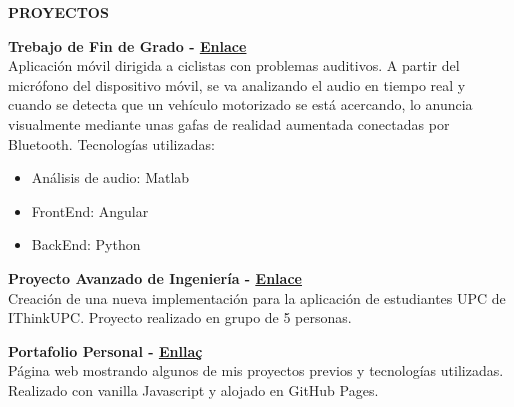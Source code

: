 \documentclass[../main.tex]{subfiles}
\begin{document}
    \textbf{\textcolor{myCV2}{PROYECTOS\underline{\hspace{15.43cm}}}}
    \vspace*{0.3cm}
    
    \textbf{Trebajo de Fin de Grado - 
        \hspace*{0.07cm}
        \textcolor{myCV2}{
        \vspace*{0.1cm}\underline{\href{https://www.youtube.com/watch?v=WKyUsdZbQ0Y}{Enlace}}}}\\
        Aplicación móvil dirigida a ciclistas con problemas auditivos. A partir del micrófono del dispositivo móvil, se va analizando el audio en tiempo real y cuando se detecta que un vehículo motorizado se está acercando, lo anuncia visualmente mediante unas gafas de realidad aumentada conectadas por Bluetooth. Tecnologías utilizadas:
        \begin{itemize}
            \vspace*{-0.2cm}
            \item Análisis de audio: Matlab
            \vspace*{-0.2cm}
            \item FrontEnd: Angular
            \vspace*{-0.2cm}
            \item BackEnd: Python
        \end {itemize}
        
        \textbf{Proyecto Avanzado de Ingeniería - 
         \hspace*{0.07cm}
         \textcolor{myCV2}{
        \vspace*{0.1cm}\underline{\href{https://www.youtube.com/watch?v=RrfiOulhY-E&t=7s}{Enlace}}}}\\
        Creación de una nueva implementación para la aplicación de estudiantes UPC de IThinkUPC. Proyecto realizado en grupo de 5 personas.

        \vspace*{0.25cm}
        \textbf{Portafolio Personal - 
         \hspace*{0.07cm}
         \textcolor{myCV2}{
        \vspace*{0.1cm}\underline{\href{https://albatalaya.github.io/}{Enllaç}}}}\\
        Página web mostrando algunos de mis proyectos previos y tecnologías utilizadas. Realizado con vanilla Javascript y alojado en GitHub Pages.

        
\end{document}
